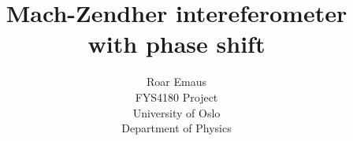 \usepackage {amsmath}
\usepackage {hyperref}
\usepackage {graphicx}
\usepackage {caption}
\usepackage {subcaption}
\usepackage {cite}
\usepackage [export]{adjustbox}

\title {Mach-Zendher intereferometer with phase shift}
\author { 
  \large
  Roar Emaus\\
  FYS4180 Project\\
  \normalsize University of Oslo\\
  \normalsize Department of Physics
}
